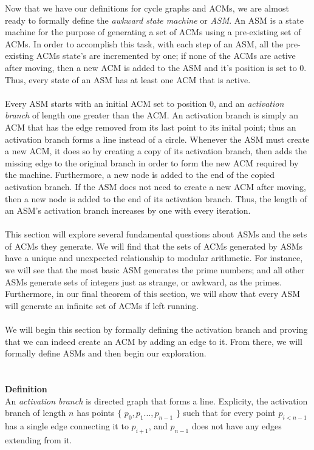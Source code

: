 \documentclass[a4paper,12pt]{article}
\begin{document}
Now that we have our definitions for cycle graphs and ACMs, we are almost ready to formally define the \textit{awkward state machine} or \textit{ASM}. An ASM is a state machine for the purpose of generating a set of ACMs using a pre-existing set of ACMs. In order to accomplish this task, with each step of an ASM, all the pre-existing ACMs state's are incremented by one; if none of the ACMs are active after moving, then a new ACM is added to the ASM and it's position is set to 0. Thus, every state of an ASM has at least one ACM that is active.\\
\\
Every ASM starts with an initial ACM set to position 0, and an \textit{activation branch} of length one greater than the ACM. An activation branch is simply an ACM that has the edge removed from its last point to its inital point; thus an activation branch forms a line instead of a circle. Whenever the ASM must create a new ACM, it does so by creating a copy of its activation branch, then adds the missing edge to the original branch in order to form the new ACM required by the machine.  Furthermore, a new node is added to the end of the copied activation branch. If the ASM does not need to create a new ACM after moving, then a new node is added to the end of its activation branch. Thus, the length of an ASM's activation branch increases by one with every iteration.\\
\\
This section will explore several fundamental questions about ASMs and the sets of ACMs they generate. We will find that the sets of ACMs generated by ASMs have a unique and unexpected relationship to modular arithmetic. For instance, we will see that the most basic ASM generates the prime numbers; and all other ASMs generate sets of integers just as strange, or awkward, as the primes. Furthermore, in our final theorem of this section, we will show that every ASM will generate an infinite set of ACMs if left running.\\   
\\
We will begin this section by formally defining the activation branch and proving that we can indeed create an ACM by adding an edge to it. From there, we will formally define ASMs and then begin our exploration.\\
\\
\\
\textbf{Definition}\\
An \textit{activation branch} is directed graph that forms a line. Explicity, the activation branch of length $n$ has points $\{$ $p_0, p_1 ..., p_{n-1}$ $\}$ such that for every point $p_{i < n -1}$ has a single edge connecting it to $p_{i+1}$, and $p_{n-1}$ does not have any edges extending from it.\\
\end{document}
